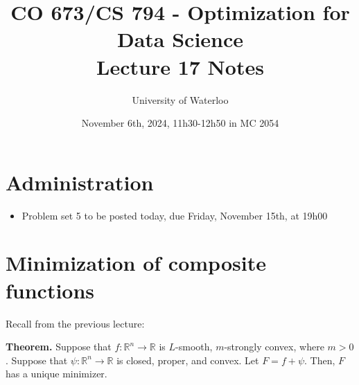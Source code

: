 \documentclass{article}
\title{CO 673/CS 794 - Optimization for Data Science\\Lecture 17 Notes}
\author{University of Waterloo}
\date{November 6th, 2024, 11h30-12h50 in MC 2054}
\newcommand{\R}{\mathbb{R}}             %
\begin{document}
\maketitle

\section{Administration}

\begin{itemize}
    \item Problem set 5 to be posted today, due Friday, November 15th, at 19h00
\end{itemize}

\section{Minimization of composite functions}

Recall from the previous lecture:

\textbf{Theorem.} Suppose that $f \colon \R^n \to \R$ is $L$-smooth, $m$-strongly convex, where $m > 0$. Suppose that $\psi \colon \R^n \to \R$ is closed, proper, and convex. Let $F = f + \psi$. Then, $F$ has a unique minimizer.
\end{document}
